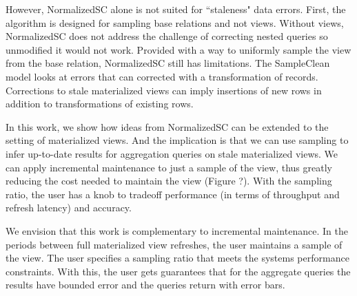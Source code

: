 However, NormalizedSC alone is not suited for ``staleness" data errors.
First, the algorithm is designed for sampling base relations and not views.
Without views, NormalizedSC does not address the challenge of correcting nested queries so unmodified it would not work.
Provided with a way to uniformly sample the view from the base relation, NormalizedSC still has limitations. 
The SampleClean model looks at errors that can corrected with a transformation of records.
Corrections to stale materialized views can imply insertions of new rows in addition to transformations of existing rows.

In this work, we show how ideas from NormalizedSC can be extended to the setting of materialized views.
And the implication is that we can use sampling to infer up-to-date results for aggregation queries on stale materialized views. 
We can apply incremental maintenance to just a sample of the view, thus greatly reducing the cost needed to maintain the view (Figure ?). 
With the sampling ratio, the user has a knob to tradeoff performance (in terms of throughput and refresh latency) and accuracy.

We envision that this work is complementary to incremental maintenance.
In the periods between full materialized view refreshes, the user maintains a sample of the view. 
The user specifies a sampling ratio that meets the systems performance constraints.
With this, the user gets guarantees that for the aggregate queries the results have bounded error and 
the queries return with error bars.


